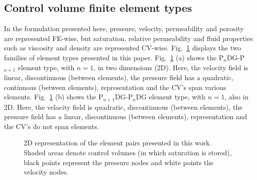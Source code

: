 \documentclass[times]{fldauth}
\begin{document}
\subsection{Control volume finite element types}
In the formulation presented here, pressure, velocity, permeability
and porosity are represented FE-wise, but saturation, relative
permeability and fluid properties such as viscosity and density are
represented CV-wise. Fig.~\ref{fem_cv_represent_a} displays the two
families of element types presented in this
paper. Fig.~\ref{fem_cv_represent_a} (a) shows the P$_{n}$DG-P$_{n+1}$
element type, with $n = 1$, in two dimensions (2D). Here, the velocity
field is linear, discontinuous (between elements), the pressure field
has a quadratic, continuous (between elements), representation and the
CV's span various elements. Fig.~\ref{fem_cv_represent_a} (b) shows
the P$_{n+1}$DG-P$_{n}$DG element type, with $n = 1$, also in 2D. Here,
the velocity field is quadratic, discontinuous (between elements), the
pressure field has a linear, discontinuous (between elements),
representation and the CV's do not span elements.

\begin{figure}[h!]
\caption{2D representation of the element pairs presented in this
  work. Shaded areas denote control volumes (in which saturation is
  stored), black points represent the pressure nodes and white points
  the velocity nodes.}
    \label{fem_cv_represent_a}
\end{figure} 
\end{document}
